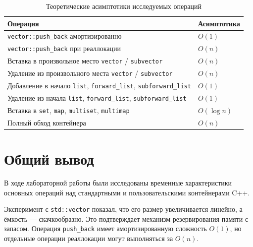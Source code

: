 \documentclass[a4paper,12pt]{article}
\begin{document}
\begin{table}[H]
    \centering
    \caption{Теоретические асимптотики исследуемых операций}
    \label{tab:complexity}
    \begin{tabular}{>{\raggedright\arraybackslash}p{8cm} >{\centering\arraybackslash}p{4cm}}
        \toprule
        Операция                                                                             & Асимптотика \\
        \midrule
        \texttt{vector::push\_back} амортизированно                                          & $O(1)$      \\
        \texttt{vector::push\_back} при реаллокации                                          & $O(n)$      \\
        Вставка в произвольное место \texttt{vector} / \texttt{subvector}                    & $O(n)$      \\
        Удаление из произвольного места \texttt{vector} / \texttt{subvector}                 & $O(n)$      \\
        Добавление в начало \texttt{list}, \texttt{forward\_list}, \texttt{subforward\_list} & $O(1)$      \\
        Удаление из начала \texttt{list}, \texttt{forward\_list}, \texttt{subforward\_list}  & $O(1)$      \\
        Вставка в \texttt{set}, \texttt{map}, \texttt{multiset}, \texttt{multimap}           & $O(\log n)$ \\
        Полный обход контейнера                                                              & $O(n)$      \\
        \bottomrule
    \end{tabular}
\end{table}

\section{Общий вывод}

В ходе лабораторной работы были исследованы временные характеристики основных операций над стандартными и пользовательскими контейнерами C++.

Эксперимент с \texttt{std::vector} показал, что его размер увеличивается линейно, а ёмкость --- скачкообразно. Это подтверждает механизм резервирования памяти с запасом. Операция \texttt{push\_back} имеет амортизированную сложность $O(1)$, но отдельные операции реаллокации могут выполняться за $O(n)$.
\end{document}
